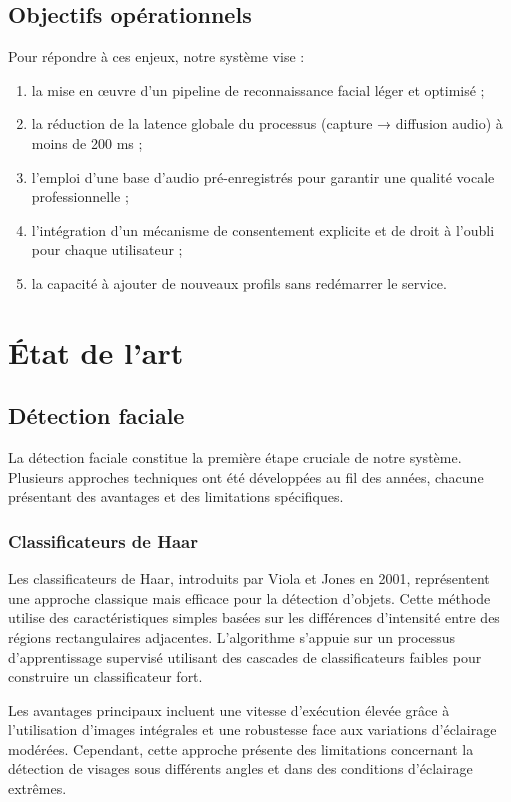 \documentclass[12pt,a4paper]{article}
\begin{document}
\subsection{Objectifs opérationnels}
Pour répondre à ces enjeux, notre système vise :
\begin{enumerate}[label=\alph*)]
  \item la mise en œuvre d’un pipeline de reconnaissance facial léger et optimisé ;
  \item la réduction de la latence globale du processus (capture → diffusion audio) à moins de 200 ms ;
  \item l’emploi d’une base d’audio pré-enregistrés pour garantir une qualité vocale professionnelle ;
  \item l’intégration d’un mécanisme de consentement explicite et de droit à l’oubli pour chaque utilisateur ;
  \item la capacité à ajouter de nouveaux profils sans redémarrer le service.
\end{enumerate}


\newpage

\section{État de l'art}

\subsection{Détection faciale}

La détection faciale constitue la première étape cruciale de notre système. Plusieurs approches techniques ont été développées au fil des années, chacune présentant des avantages et des limitations spécifiques.

\subsubsection{Classificateurs de Haar}

Les classificateurs de Haar, introduits par Viola et Jones en 2001, représentent une approche classique mais efficace pour la détection d'objets. Cette méthode utilise des caractéristiques simples basées sur les différences d'intensité entre des régions rectangulaires adjacentes. L'algorithme s'appuie sur un processus d'apprentissage supervisé utilisant des cascades de classificateurs faibles pour construire un classificateur fort.

Les avantages principaux incluent une vitesse d'exécution élevée grâce à l'utilisation d'images intégrales et une robustesse face aux variations d'éclairage modérées. Cependant, cette approche présente des limitations concernant la détection de visages sous différents angles et dans des conditions d'éclairage extrêmes.
\end{document}
